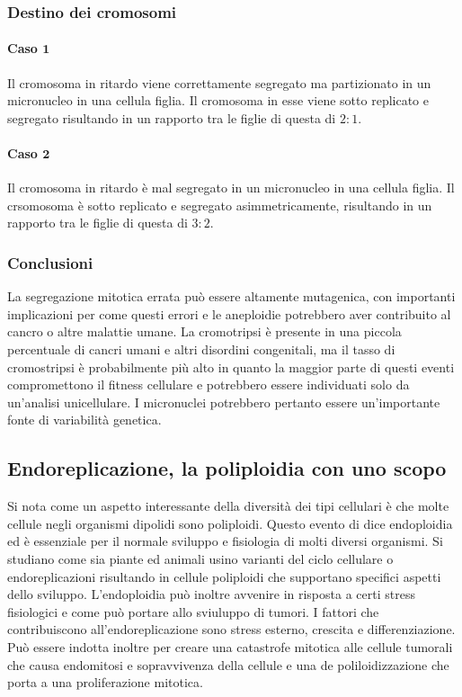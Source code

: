 \subsubsection{Destino dei cromosomi}
\paragraph{Caso $\mathbf{1}$}
Il cromosoma in ritardo viene correttamente segregato ma partizionato in un micronucleo in una cellula figlia. Il cromosoma in esse viene sotto replicato e segregato risultando in un
rapporto tra le figlie di questa di $2:1$.
\paragraph{Caso $\mathbf{2}$}
Il cromosoma in ritardo \`e mal segregato in un micronucleo in una cellula figlia. Il crsomosoma \`e sotto replicato e segregato asimmetricamente, risultando in un rapporto tra le figlie
di questa di $3:2$.
\subsubsection{Conclusioni}
La segregazione mitotica errata pu\`o essere altamente mutagenica, con importanti implicazioni per come questi errori e le aneploidie potrebbero aver contribuito al cancro o altre 
malattie umane. La cromotripsi \`e presente in una piccola percentuale di cancri umani e altri disordini congenitali, ma il tasso di cromostripsi \`e probabilmente pi\`u alto in 
quanto la maggior parte di questi eventi compromettono il fitness cellulare e potrebbero essere individuati solo da un'analisi unicellulare. I micronuclei potrebbero pertanto 
essere un'importante fonte di variabilit\`a genetica. 
\subsection{Endoreplicazione, la poliploidia con uno scopo}
Si nota come un aspetto interessante della diversit\`a dei tipi cellulari \`e che molte cellule negli organismi dipolidi sono poliploidi. Questo evento di dice endoploidia ed \`e 
essenziale per il normale sviluppo e fisiologia di molti diversi organismi. Si studiano come sia piante ed animali usino varianti del ciclo cellulare o endoreplicazioni risultando in
cellule poliploidi che supportano specifici aspetti dello sviluppo. L'endoploidia pu\`o inoltre avvenire in risposta a certi stress fisiologici e come pu\`o portare allo sviuluppo di 
tumori. I fattori che contribuiscono all'endoreplicazione sono stress esterno, crescita e differenziazione. Pu\`o essere indotta inoltre per creare una catastrofe mitotica alle 
cellule tumorali che causa endomitosi e sopravvivenza della cellule e una de poliloidizzazione che porta a una proliferazione mitotica. 
